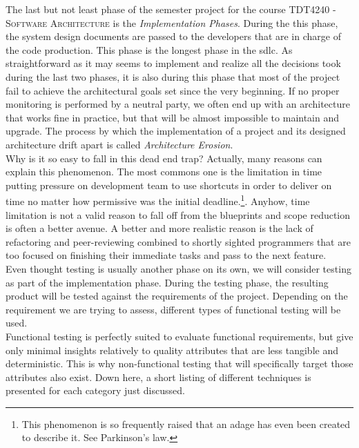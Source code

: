 
The last but not least phase of the semester project for the course \textsc{TDT4240 - Software Architecture} is the \textit{Implementation Phases}. During the this phase, the system design documents are passed to the developers that are in charge of the code production. This phase is the longest phase in the \gls{sdlc}. As straightforward as it may seems to implement and realize all the decisions took during the last two phases, it is also during this phase that most of the project fail to achieve the architectural goals set since the very beginning. If no proper monitoring is performed by a neutral party, we often end up with an architecture that works fine in practice, but that will be almost impossible to maintain and upgrade. The process by which the implementation of a project and its designed architecture drift apart is called \textit{Architecture Erosion}. \cite[Chapter 19]{bass2013}
 \\

Why is it so easy to fall in this dead end trap? Actually, many reasons can explain this phenomenon. The most commons one is the limitation in time putting pressure on development team to use shortcuts in order to deliver on time no matter how permissive was the initial deadline.\footnote{This phenomenon is so frequently raised that an adage has even been created to describe it. See Parkinson's law.\cite{wiki:parkinsonLaw}}. Anyhow, time limitation is not a valid reason to fall off from the blueprints and scope reduction is often a better avenue. A better and more realistic reason is the lack of refactoring and peer-reviewing combined to shortly sighted programmers that are too focused on finishing their immediate tasks and pass to the next feature. \\

Even thought testing is usually another phase on its own, we will consider testing as part of the implementation phase. During the testing phase, the resulting product will be tested against the requirements of the project. Depending on the requirement we are trying to assess, different types of functional testing will be used. \cite{istqbexamSDLC} \\
Functional testing is perfectly suited to evaluate functional requirements, but give only minimal insights relatively to quality attributes that are less tangible and deterministic. This is why non-functional testing that will specifically target those attributes also exist. Down here, a short listing of different techniques is presented for each category just discussed. \\

